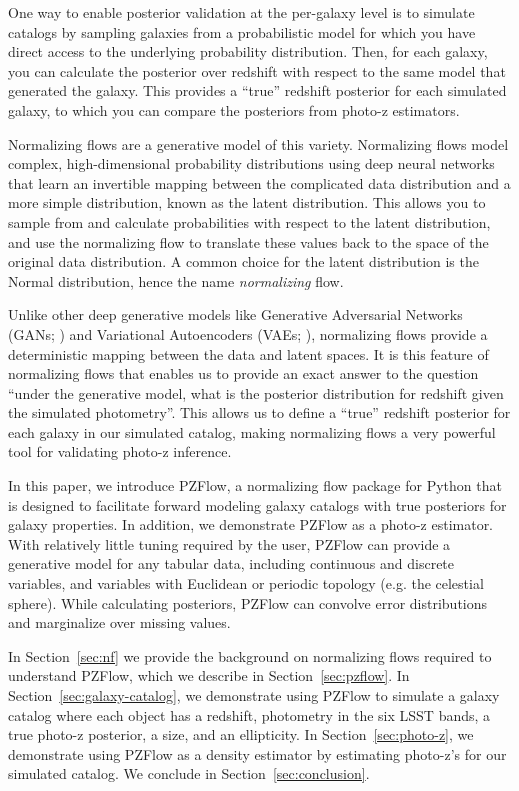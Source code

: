 \documentclass[twocolumn,twocolappendix]{aastex631}
\begin{document}
One way to enable posterior validation at the per-galaxy level is to simulate catalogs by sampling galaxies from a probabilistic model for which you have direct access to the underlying probability distribution.
Then, for each galaxy, you can calculate the posterior over redshift with respect to the same model that generated the galaxy.
This provides a ``true'' redshift posterior for each simulated galaxy, to which you can compare the posteriors from photo-z estimators.

Normalizing flows are a generative model of this variety.
Normalizing flows model complex, high-dimensional probability distributions using deep neural networks that learn an invertible mapping between the complicated data distribution and a more simple distribution, known as the latent distribution.
This allows you to sample from and calculate probabilities with respect to the latent distribution, and use the normalizing flow to translate these values back to the space of the original data distribution.
A common choice for the latent distribution is the Normal distribution, hence the name \emph{normalizing} flow.

Unlike other deep generative models like Generative Adversarial Networks (GANs; \citealt{goodfellow2014}) and Variational Autoencoders (VAEs; \citealt{kingma2014}), normalizing flows provide a deterministic mapping between the data and latent spaces.
It is this feature of normalizing flows that enables us to provide an exact answer to the question ``under the generative model, what is the posterior distribution for redshift given the simulated photometry''.
This allows us to define a ``true'' redshift posterior for each galaxy in our simulated catalog, making normalizing flows a very powerful tool for validating photo-z inference.

In this paper, we introduce PZFlow, a normalizing flow package for Python that is designed to facilitate forward modeling galaxy catalogs with true posteriors for galaxy properties.
In addition, we demonstrate PZFlow as a photo-z estimator.
With relatively little tuning required by the user, PZFlow can provide a generative model for any tabular data, including continuous and discrete variables, and variables with Euclidean or periodic topology (e.g. the celestial sphere).
While calculating posteriors, PZFlow can convolve error distributions and marginalize over missing values.

In Section~\ref{sec:nf} we provide the background on normalizing flows required to understand PZFlow, which we describe in Section~\ref{sec:pzflow}.
In Section~\ref{sec:galaxy-catalog}, we demonstrate using PZFlow to simulate a galaxy catalog where each object has a redshift, photometry in the six LSST bands, a true photo-z posterior, a size, and an ellipticity.
In Section~\ref{sec:photo-z}, we demonstrate using PZFlow as a density estimator by estimating photo-z's for our simulated catalog.
We conclude in Section~\ref{sec:conclusion}.
\end{document}
